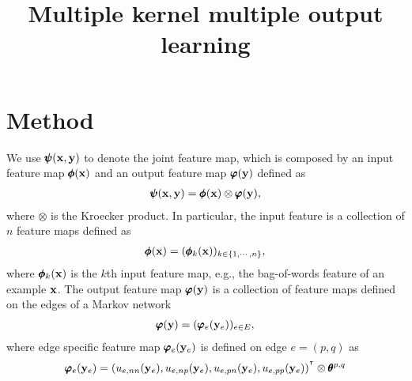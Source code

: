 \documentclass{article} %
\title{Multiple kernel multiple output learning}
\author{
}
\begin{document}
\maketitle

\begin{abstract}
\end{abstract}

\section{Method}


We use $\pmb \psi(\mathbf {x},\mathbf {y})$ to denote the joint feature map, which is composed by an input feature map $\pmb \phi(\mathbf {x})$ and an output feature map $\pmb \varphi(\mathbf {y})$ defined as
\begin{align*}
	\pmb \psi(\mathbf {x},\mathbf {y}) = \pmb \phi(\mathbf {x})\otimes\pmb \varphi(\mathbf {y}),
\end{align*}
where $\otimes$ is the Kroecker product. 
In particular, the input feature is a collection of $n$ feature maps defined as
\begin{align*}
	\pmb \phi(\mathbf {x}) = (\pmb \phi_k(\mathbf {x}))_{k\in\{1,\cdots,n\}},
\end{align*}
where $\pmb \phi_k(\mathbf {x})$ is the $k$th input feature map, e.g., the bag-of-words feature of an example $\mathbf {x}$.
The output feature map $\pmb \varphi(\mathbf {y})$ is a collection of feature maps defined on the edges of a Markov network
\begin{align*}
	\pmb \varphi(\mathbf {y}) = (\pmb \varphi_e(\mathbf {y}_e))_{e\in E},
\end{align*}
where edge specific feature map $\pmb \varphi_e(\mathbf {y}_e)$ is defined on edge $e=(p,q)$ as
\begin{align*}
	\pmb \varphi_e(\mathbf {y}_e) = (u_{e,{\sc nn}}(\mathbf {y}_e),u_{e,{\sc np}}(\mathbf {y}_e),u_{e,{\sc pn}}(\mathbf {y}_e),u_{e,{\sc pp}}(\mathbf {y}_e))^{^{\intercal}}\otimes\pmb \theta^{p,q}
\end{align*}

\end{document}
